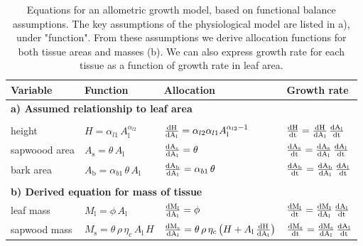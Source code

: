\documentclass[10pt,twoside]{article}
\begin{document}
\newpage

\begin{table}[h!]
\caption{Equations for an allometric growth model, based on functional balance assumptions.
The key assumptions of the physiological model are listed in a), under "function". From these
assumptions we derive allocation functions for both tissue areas and masses (b). We can also
express growth rate for each tissue as a function of growth rate in leaf area. }
\centering
  \begin{tabular}{p{2.5cm}p{3.5cm}p{5cm}p{4cm} }\\ \hline
  Variable & Function & Allocation & Growth rate\\ \hline
  \multicolumn{4}{l}{\textbf{a) Assumed relationship to leaf area}} \\ \\
  height &
    $H = \alpha_{l1} \, A_\textrm{l}^{\alpha_{l2}}$ &
    $\frac{\rm{d}H}{\rm{d}A_\textrm{l}} = \alpha_{l2} \alpha_{l1} A_\textrm{l}^{\alpha_{l2}-1}$ &
    $\frac{\rm{d}H}{\rm{d}t} = \frac{\rm{d}H}{\rm{d}A_\textrm{l}} \, \frac{\rm{d}A_\textrm{l}}{\rm{d}t}$ \\
  sapwoood area &
    $A_\textrm{s} = \theta \, A_\textrm{l}$ &
    $\frac{\rm{d}A_\textrm{s}}{\rm{d} A_\textrm{l}} = \theta$ &
    $\frac{\rm{d}A_\textrm{s}}{\rm{d}t} = \frac{\rm{d}A_\textrm{s}}{\rm{d} A_\textrm{l}} \, \frac{\rm{d}A_\textrm{l}}{\rm{d}t}$ \\
  bark area &
    $A_\textrm{b} = \alpha_{b1} \, \theta \, A_\textrm{l}$ &
    $\frac{\rm{d}A_\textrm{b}}{\rm{d} A_\textrm{l}} = \alpha_{b1} \, \theta$ &
    $\frac{\rm{d}A_\textrm{b}}{\rm{d}t} = \frac{\rm{d}A_\textrm{b}}{\rm{d} A_\textrm{l}} \, \frac{\rm{d}A_\textrm{l}}{\rm{d}t}$ \\  \\
  \multicolumn{4}{l}{\textbf{b) Derived equation for mass of tissue }} \\
  leaf mass &
    $M_\textrm{l} = \phi \, A_\textrm{l} $ &
    $\frac{\rm{d}M_\textrm{l}}{\rm{d}A_\textrm{l}} = \phi$ &
    $\frac{\rm{d}M_\textrm{l}}{\rm{d}t} = \frac{\rm{d}M_\textrm{l}}{\rm{d}A_\textrm{l}} \, \frac{\rm{d}A_\textrm{l}}{\rm{d}t}$ \\
  sapwood mass &
    $M_\textrm{s} = \theta \, \rho \, \eta_c \, A_\textrm{l} \, H $ &
    $\frac{\rm{d}M_\textrm{s}}{\rm{d}A_\textrm{l}} = \theta \, \rho \, \eta_c \, \big(H + A_\textrm{l} \, \frac{\rm{d}H}{\rm{d}A_\textrm{l}} \big)$ &
    $\frac{\rm{d}M_\textrm{s}}{\rm{d}t} = \frac{\rm{d}M_\textrm{s}}{\rm{d}A_\textrm{l}} \, \frac{\rm{d}A_\textrm{l}}{\rm{d}t}$ \\

\end{tabular}
\end{table}
\end{document}
